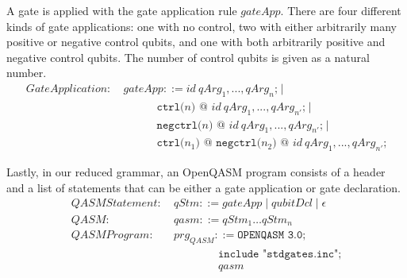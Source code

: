 A gate is applied with the gate application rule $gateApp$. There are four different kinds of gate applications: one with no control, two with either arbitrarily many positive or negative control qubits, and one with both arbitrarily positive and negative control qubits. The number of control qubits is given as a natural number. 
\begin{align*}
GateApplication: \ & gateApp::= id \ qArg_1, ..., qArg_n \texttt{;}\mid\\
& \quad \quad \quad \texttt{ctrl(}n\texttt{)} \texttt{ @ } id \ qArg_1, ..., qArg_{n'} \texttt{;} \mid\\
& \quad \quad \quad \texttt{negctrl(}n\texttt{)} \texttt{ @ } id \ qArg_1, ..., qArg_{n'} \texttt{;} \mid\\
    & \quad \quad \quad \texttt{ctrl(}n_1\texttt{)} \texttt{ @ } \texttt{negctrl(}n_2\texttt{)} \texttt{ @ } id \ qArg_1, ..., qArg_{n'} \texttt{;}
\end{align*}

Lastly, in our reduced grammar, an OpenQASM program consists of a header and a list of statements that can be either a gate application or gate declaration.
\begin{align*}
    QASMStatement: \ & qStm::= gateApp \mid qubitDcl \mid \epsilon\\
    QASM: \ & qasm ::= qStm_1 \dots qStm_n\\
    QASMProgram: \ & prg_{QASM} ::= \texttt{OPENQASM 3.0;}\\
            & \quad \quad \quad \quad \texttt{include "stdgates.inc";}\\
            & \quad \quad \quad \quad qasm
\end{align*}